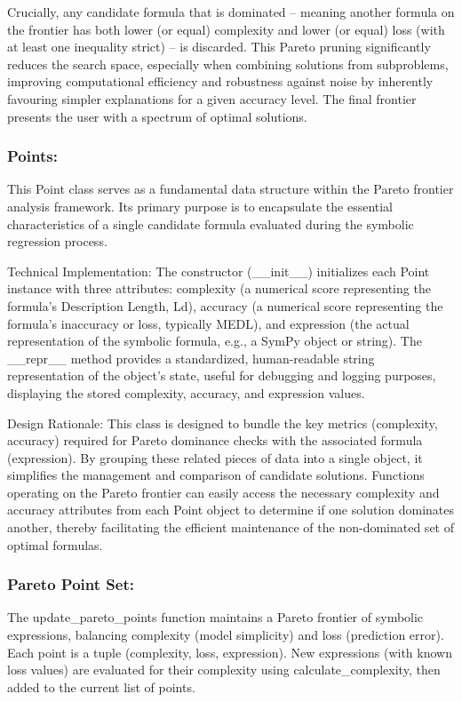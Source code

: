 \documentclass{article}
\begin{document}
Crucially, any candidate formula that is dominated – meaning another formula on the frontier has both lower (or equal) complexity and lower (or equal) loss (with at least one inequality strict) – is discarded. This Pareto pruning significantly reduces the search space, especially when combining solutions from subproblems, improving computational efficiency and robustness against noise by inherently favouring simpler explanations for a given accuracy level. The final frontier presents the user with a spectrum of optimal solutions.\\

\subsubsection{Points: }

This Point class serves as a fundamental data structure within the Pareto frontier analysis framework. Its primary purpose is to encapsulate the essential characteristics of a single candidate formula evaluated during the symbolic regression process.

Technical Implementation: The constructor (__init__) initializes each Point instance with three attributes: complexity (a numerical score representing the formula's Description Length, Ld), accuracy (a numerical score representing the formula's inaccuracy or loss, typically MEDL), and expression (the actual representation of the symbolic formula, e.g., a SymPy object or string). The __repr__ method provides a standardized, human-readable string representation of the object's state, useful for debugging and logging purposes, displaying the stored complexity, accuracy, and expression values.

Design Rationale: This class is designed to bundle the key metrics (complexity, accuracy) required for Pareto dominance checks with the associated formula (expression). By grouping these related pieces of data into a single object, it simplifies the management and comparison of candidate solutions. Functions operating on the Pareto frontier can easily access the necessary complexity and accuracy attributes from each Point object to determine if one solution dominates another, thereby facilitating the efficient maintenance of the non-dominated set of optimal formulas.

\subsubsection{Pareto Point Set: }
The update_pareto_points function maintains a Pareto frontier of symbolic expressions, balancing complexity (model simplicity) and loss (prediction error). Each point is a tuple (complexity, loss, expression). New expressions (with known loss values) are evaluated for their complexity using calculate_complexity, then added to the current list of points.
\end{document}
